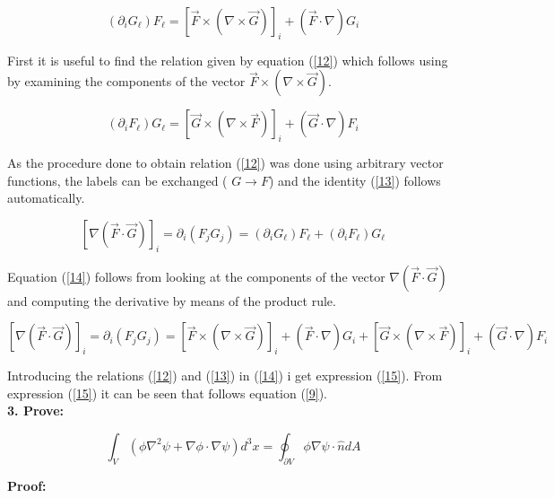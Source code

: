\documentclass[oneside]{book}
\begin{document}
\begin{equation}
\label{12}  ( \partial_i G_{\ell} )F_{\ell} = [\vec{F} \times (\nabla \times \vec{G})]_i +  (\vec{F} \cdot \nabla) G_i
\end{equation}

First it is useful to find the relation given by equation (\ref{12}) which follows using by examining the components of the vector $\vec{F} \times (\nabla \times \vec{G})$.


\begin{equation}
\label{13}  ( \partial_i F_{\ell} )G_{\ell} = [\vec{G} \times (\nabla \times \vec{F})]_i +  (\vec{G} \cdot \nabla) F_i
\end{equation}

As the procedure done to obtain relation (\ref{12}) was done using arbitrary vector functions, the labels can be exchanged ( $G\longrightarrow F$) and the identity (\ref{13}) follows automatically.




\begin{equation}
\label{14} [\nabla (\vec{F} \cdot \vec{G})]_i = \partial_i (F_j G_j) = ( \partial_i G_{\ell} )F_{\ell} + ( \partial_i F_{\ell} )G_{\ell}
\end{equation}

Equation (\ref{14})  follows from looking at the components of the vector $\nabla (\vec{F} \cdot \vec{G})$ and computing the derivative by means of the product rule.




\begin{equation}
\label{15} [\nabla (\vec{F} \cdot \vec{G})]_i = \partial_i (F_j G_j) =  [\vec{F} \times (\nabla \times \vec{G})]_i +  (\vec{F} \cdot \nabla) G_i   + [\vec{G} \times (\nabla \times \vec{F})]_i +  (\vec{G} \cdot \nabla) F_i
\end{equation}

Introducing the relations (\ref{12}) and (\ref{13}) in (\ref{14}) i get expression (\ref{15}). From expression (\ref{15}) it can be seen that follows equation (\ref{9}).\\


\textbf{3. Prove:}


\begin{equation}
\label{16} \int_V (\phi \nabla^2 \psi + \nabla \phi \cdot \nabla \psi ) d^3 x = \oint_{\partial V} \phi \nabla \psi \cdot \hat{n} dA 
\end{equation}


\textbf{Proof:}
\end{document}
